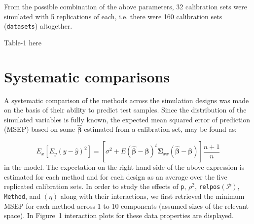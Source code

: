 \documentclass[a4paper, 11pt]{article}
\begin{document}
From the possible combination of the above parameters, 32 calibration sets were simulated with 5 replications of each, i.e. there were 160 calibration sets ({\tt datasets}) altogether.

\bigskip

\begin{center}
 Table-1 here 
\end{center}

 
\section{Systematic comparisons}

A systematic comparison of the methods across the simulation designs was made on the basis of their ability to predict test samples. Since the distribution of the simulated variables is fully known, the expected mean squared error of prediction (MSEP) based on some $\hat{\bm{\beta}}$ estimated from a calibration set, may be found as:

\begin{equation*}
    E_x\left[E_y\left(y - \hat{y}\right)^2\right] =
    \left[\sigma^2 + E\left(\hat{\bm{\beta}} - \bm{\beta}\right)^t\bm{\Sigma}_{xx}\left(\hat{\bm{\beta}} - \bm{\beta}\right)\right]\frac{n+1}{n}
\end{equation*}
in the model. The expectation on the right-hand side of the above expression is estimated for each method and for each design as an average over the five replicated calibration sets. In order to study the effects of {\tt p}, $\rho^2$, {\tt relpos}$(\mathcal{P})$, {\tt Method}, and $(\eta)$ along with their interactions, we first retrieved the minimum MSEP for each method across 1 to 10 components (assumed sizes of the relevant space). In Figure~1 interaction plots for these data properties are displayed.
\end{document}
